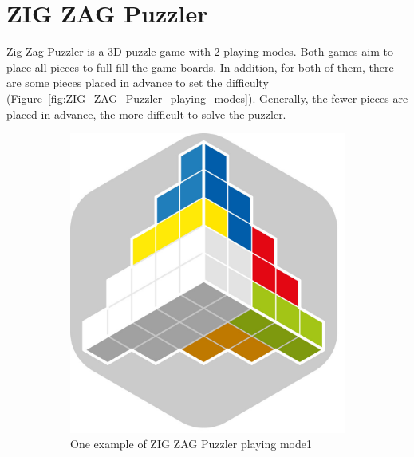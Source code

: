 \section{ZIG ZAG Puzzler}
Zig Zag Puzzler is a 3D puzzle game with 2 playing modes. Both games aim to place all pieces to full fill the game boards. In addition, for both of them, there are some pieces placed in advance to set the difficulty (Figure~\ref{fig:ZIG_ZAG_Puzzler_playing_modes}). Generally, the fewer pieces are placed in advance, the more difficult to solve the puzzler.
\begin{figure}[htbp]
    \centering
    \begin{subfigure}[b]{0.4\textwidth}
    \includegraphics[width=\textwidth]{figs/zig_zag_mode1.jpg}
    \caption{One example of ZIG ZAG Puzzler playing mode1}
    \end{subfigure}
    \begin{subfigure}[b]{0.4\textwidth}

\end{subfigure}
\end{figure}

